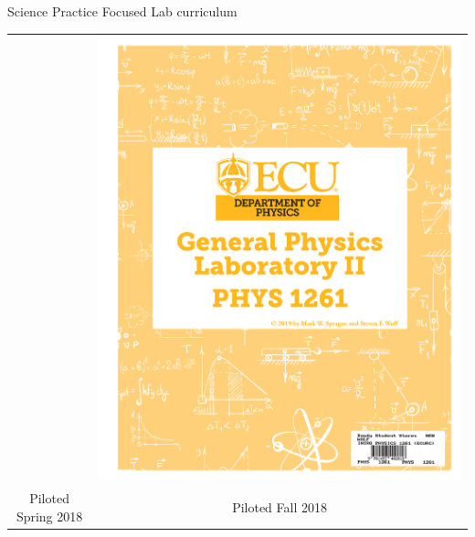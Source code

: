 \documentclass[xcolor=dvipsnames,table]{beamer}
\begin{document}
\begin{frame}{Science Practice Focused Lab curriculum}
\begin{tabular}{cc}
    &\includegraphics[height=0.6\textheight]{./clipart/p1261cover.pdf} \\
    Piloted Spring 2018 &Piloted Fall 2018 \\
  \end{tabular}
\end{frame}
\end{document}
